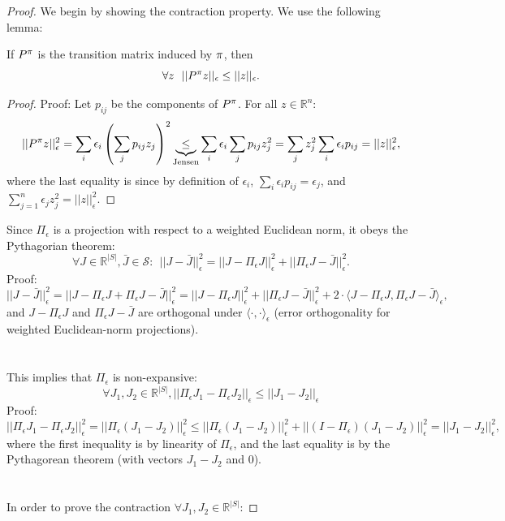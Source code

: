 \begin{proof}
We begin by showing the contraction property. We use the following lemma:
\begin{lemma}\label{lem:P_non_expansion} If $P^\pi$ is the transition matrix induced by $\pi$, then
$$\forall z \ \ ||P^\pi z||_\epsilon \le ||z||_\epsilon.$$
\end{lemma}
\begin{proof}
Proof: Let $p_{ij}$ be the components of $P^\pi$. For all $z \in \mathbb{R}^n$:
$$||P^\pi z||_\epsilon^2 = \sum_i \epsilon_i\left(\sum_j p_{ij}z_j\right)^2 \underbrace{\leq}_{\textrm{Jensen}} \sum_i \epsilon_i \sum_j p_{ij} z_j^2 =  \sum_j z_j^2 \sum_i\epsilon_i p_{ij} = ||z||_\epsilon^2,$$
where the last equality is since by definition of $\epsilon_i$, $\sum_i\epsilon_i p_{ij}  =\epsilon_j$, and
$\sum_{j=1}^n\epsilon_j z_j^2 = ||z||_\epsilon^2.$
\end{proof}
Since $\Pi_\epsilon$ is a projection with respect to a weighted Euclidean norm, it obeys the Pythagorian theorem:
$$\forall J\in \mathbb{R}^{|S|}, \bar{J}\in \mathcal{S}: \ \ ||J-\bar{J}||_\epsilon^2 = ||J-\Pi_\epsilon J||_\epsilon^2 + ||\Pi_\epsilon J - \bar{J}||_\epsilon^2.$$
Proof:
$$||J-\bar{J}||_\epsilon^2 = ||J-\Pi_\epsilon J + \Pi_\epsilon J - \bar{J}||_\epsilon^2 = ||J-\Pi_\epsilon J||_\epsilon^2 + ||\Pi_\epsilon J - \bar{J}||_\epsilon^2 + 2 \cdot \langle J-\Pi_\epsilon J, \Pi_\epsilon J - \bar{J}\rangle_\epsilon,$$
and $J-\Pi_\epsilon J$ and $\Pi_\epsilon J-\bar{J}$ are orthogonal under $\langle\cdot,\cdot\rangle_\epsilon$ (error orthogonality for weighted Euclidean-norm projections).
\\
\\
\\
This implies that $\Pi_\epsilon$ is non-expansive:
$$\forall {J}_1,{J}_2\in \mathbb{R}^{|S|}, ||\Pi_\epsilon {J}_1 - \Pi_\epsilon {J}_2||_\epsilon \le ||{J}_1-{J}_2||_\epsilon$$
Proof:
$$||\Pi_\epsilon {J}_1 - \Pi_\epsilon {J}_2||_\epsilon^2 = ||\Pi_\epsilon({J}_1-{J}_2)||_\epsilon^2 \le ||\Pi_\epsilon({J}_1-{J}_2)||_\epsilon^2 + ||(I-\Pi_\epsilon)({J}_1-{J}_2)||_\epsilon^2 = ||{J}_1-{J}_2||_\epsilon^2,$$
where the first inequality is by linearity of $\Pi_\epsilon$, and the last equality is by the Pythagorean theorem (with vectors ${J}_1-{J}_2$ and $0$).
\\
\\
\\
In order to prove the contraction $\forall {J}_1,{J}_2\in \mathbb{R}^{|S|}$:

\end{proof}
